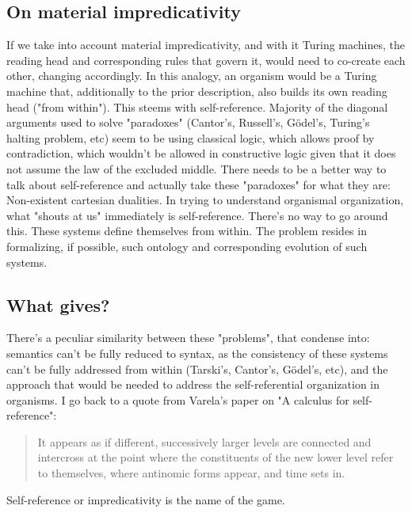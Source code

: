 \documentclass[a4paper,12pt,twoside,leqno]{article}
\begin{document}
\subsection*{On material impredicativity}
If we take into account material impredicativity, and with it Turing machines, the reading head and corresponding rules that govern it, would need to co-create each other, changing accordingly. In this analogy, an organism would be a Turing machine that, additionally to the prior description, also builds its own reading head ("from within"). This steems with self-reference. Majority of the diagonal arguments used to solve "paradoxes" (Cantor's, Russell's, Gödel's, Turing's halting problem, etc) seem to be using classical logic, which allows proof by contradiction, which wouldn't be allowed in constructive logic given that it does not assume the law of the excluded middle. There needs to be a better way to talk about self-reference and actually take these "paradoxes" for what they are: Non-existent cartesian dualities. In trying to understand organismal organization, what "shouts at us" immediately is self-reference. There's no way to go around this. These systems define themselves from within. The problem resides in formalizing, if possible, such ontology and corresponding evolution of such systems.  
\subsection*{What gives?}
There's a peculiar similarity between these "problems", that condense into: semantics can't be fully reduced to syntax, as the consistency of these systems can't be fully addressed from within (Tarski's, Cantor's, Gödel's, etc), and the approach that would be needed to address the self-referential organization in organisms. I go back to a quote from Varela's paper on "A calculus for self-reference":
\begin{quotation}
It appears as if different, successively larger levels are connected and intercross at the point where the constituents of the new lower level refer to themselves, where antinomic forms appear, and time sets in.
\end{quotation}
Self-reference or impredicativity is the name of the game.
\end{document}
